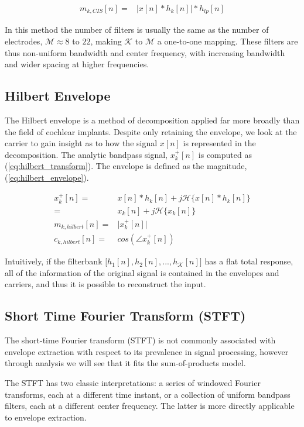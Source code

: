 \documentclass [11pt, proquest,oneside] {ganter_thesis}[2015/03/03]
\begin{document}
\begin{align}
m_{k,CIS}[n] =& \Big| x[n] * h_k[n] \Big| * h_{lp}[n]
\end{align}

In this method the number of filters is usually the same as the number of electrodes, $\mathcal{M} \approx 8$ to $22$, making $\mathcal{K}$ to $\mathcal{M}$ a one-to-one mapping.  These filters are thus non-uniform bandwidth and center frequency, with increasing bandwidth and wider spacing at higher frequencies.

\subsection{Hilbert Envelope}

The Hilbert envelope is a method of decomposition applied far more broadly than the field of cochlear implants.  Despite only retaining the envelope, we look at the carrier to gain insight as to how the signal $x[n]$ is represented in the decomposition.  The analytic bandpass signal, $x^+_k[n]$ is computed as (\ref{eq:hilbert_transform}).  The envelope is defined as the magnitude, (\ref{eq:hilbert_envelope}).

\begin{align}
\label{eq:hilbert_transform}
x_k^+[n] =& x[n] * h_k[n] + j\mathcal{H}\{x[n] * h_k[n]\} \nonumber \\
=& x_k[n] + j\mathcal{H}\{x_k[n]\} \\
\label{eq:hilbert_envelope}
m_{k,hilbert}[n] =& \Big| x^+_k[n] \Big| \\
c_{k,hilbert}[n] =& cos(\angle x^+_k[n])
\end{align}

Intuitively, if the filterbank $\Big[h_1[n], h_2[n], ...,h_\mathcal{K}[n]\Big]$ has a flat total response, all of the information of the original signal is contained in the envelopes and carriers, and thus it is possible to reconstruct the input.

\subsection{Short Time Fourier Transform (STFT)}

The short-time Fourier transform (STFT) is not commonly associated with envelope extraction with respect to its prevalence in signal processing, however through analysis we will see that it fits the sum-of-products model.

The STFT has two classic interpretations: a series of windowed Fourier transforms, each at a different time instant, or a collection of uniform bandpass filters, each at a different center frequency.  The latter is more directly applicable to envelope extraction.
\end{document}
